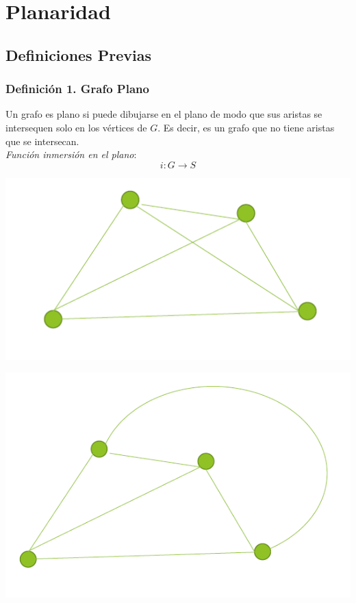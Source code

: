 \documentclass{article}
\begin{document}
\newpage
\section{Planaridad}
\subsection{Definiciones Previas}
\subsubsection*{Definición 1. Grafo Plano}
Un grafo es plano si puede dibujarse en el plano de modo que sus aristas se intersequen solo en los vértices de $G$. Es decir, es un grafo que no tiene aristas que se intersecan.
\\\emph{Función inmersión en el plano}:
\begin{equation*}
    i: G \rightarrow S
\end{equation*}
\begin{minipage}[C]{.50 \textwidth}
    \includegraphics[width=.70\textwidth]{planaridad1.PNG}
\end{minipage}
\begin{minipage}[C]{.50 \textwidth}
    \includegraphics[width=.70\textwidth]{planaridad2.PNG}
\end{minipage}
\end{document}

